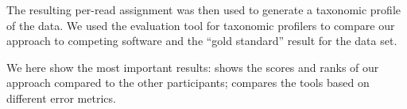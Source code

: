The resulting per-read assignment was then used to generate a taxonomic profile of the data.
We used the  evaluation tool for taxonomic profilers  \citep{Sczyrba2017}
to compare our approach to competing software and the ``gold standard'' result for the data set.

We here show the most important  results:
 shows the scores and ranks of our approach compared to the other  participants;
 compares the tools based on different error metrics.%

